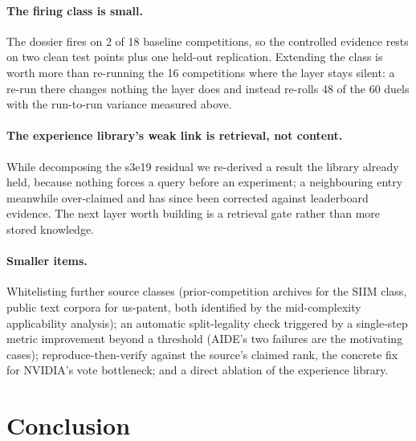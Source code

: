 \documentclass[11pt,a4paper]{article}
\begin{document}
\paragraph{The firing class is small.} The dossier fires on 2 of 18 baseline competitions, so
the controlled evidence rests on two clean test points plus one held-out replication.
Extending the class is worth more than re-running the 16 competitions where the layer stays
silent: a re-run there changes nothing the layer does and instead re-rolls 48 of the 60 duels
with the run-to-run variance measured above.

\paragraph{The experience library's weak link is retrieval, not content.} While decomposing
the s3e19 residual we re-derived a result the library already held, because nothing forces a
query before an experiment; a neighbouring entry meanwhile over-claimed and has since been
corrected against leaderboard evidence. The next layer worth building is a retrieval gate
rather than more stored knowledge.

\paragraph{Smaller items.} Whitelisting further source classes (prior-competition archives for
the SIIM class, public text corpora for us-patent, both identified by the mid-complexity
applicability analysis); an automatic split-legality check triggered by a single-step metric
improvement beyond a threshold (AIDE's two failures are the motivating cases); reproduce-then-verify
against the source's claimed rank, the concrete fix for NVIDIA's vote bottleneck; and a direct
ablation of the experience library.

\section{Conclusion}
\end{document}
